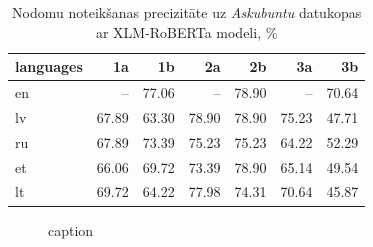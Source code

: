 \begin{table}[htbp]
  \centering
  \caption{Nodomu noteikšanas precizitāte uz \textit{Askubuntu} datukopas ar XLM-RoBERTa modeli, \%}
    \begin{tabular}{lrrrrrr}\toprule
    languages & 1a & 1b & 2a & 2b & 3a & 3b \\\midrule
    en    &   --  & 77.06 &  --   & 78.90 &  --   & 70.64 \\
    lv    & 67.89 & 63.30 & 78.90 & 78.90 & 75.23 & 47.71 \\
    ru    & 67.89 & 73.39 & 75.23 & 75.23 & 64.22 & 52.29 \\
    et    & 66.06 & 69.72 & 73.39 & 78.90 & 65.14 & 49.54 \\
    lt    & 69.72 & 64.22 & 77.98 & 74.31 & 70.64 & 45.87 \\\bottomrule
    \end{tabular}%
  \label{tab:askubuntu-xlm}%
\end{table}%



\begin{figure}[h] 
   \centering
   \caption{caption} 
   \label{fig:askubuntu-bert}
\end{figure}


